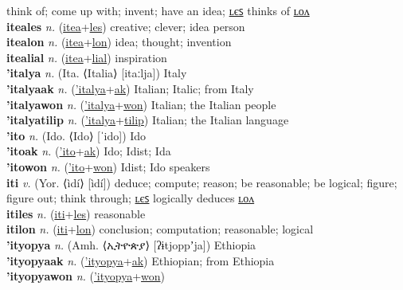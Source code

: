 think of; come up with; invent; have an idea; \hyperref[iteales]{ʟєꜱ} thinks of \hyperref[itealon]{ʟᴏᴧ} \label{itea} \\
\textbf{iteales} \textit{n.} (\hyperref[itea]{itea}+\hyperref[les]{les})
creative; clever; idea person \label{iteales} \\
\textbf{itealon} \textit{n.} (\hyperref[itea]{itea}+\hyperref[lon]{lon})
idea; thought; invention \label{itealon} \\
\textbf{itealial} \textit{n.} (\hyperref[itea]{itea}+\hyperref[lial]{lial})
inspiration \label{itealial} \\
\textbf{'italya} \textit{n.} (Ita. ⟨Italia⟩ [itaːlja])
Italy \label{'italya} \\
\textbf{'italyaak} \textit{n.} (\hyperref['italya]{'italya}+\hyperref[ak]{ak})
Italian; Italic; from Italy \label{'italyaak} \\
\textbf{'italyawon} \textit{n.} (\hyperref['italya]{'italya}+\hyperref[won]{won})
Italian; the Italian people \label{'italyawon} \\
\textbf{'italyatilip} \textit{n.} (\hyperref['italya]{'italya}+\hyperref[tilip]{tilip})
Italian; the Italian language \label{'italyatilip} \\
\textbf{'ito} \textit{n.} (Ido. ⟨Ido⟩ [ˈido])
Ido \label{'ito} \\
\textbf{'itoak} \textit{n.} (\hyperref['ito]{'ito}+\hyperref[ak]{ak})
Ido; Idist; Ida \label{'itoak} \\
\textbf{'itowon} \textit{n.} (\hyperref['ito]{'ito}+\hyperref[won]{won})
Idist; Ido speakers \label{'itowon} \\
\textbf{iti} \textit{v.} (Yor. ⟨ìdí⟩ [ìdí])
deduce; compute; reason; be reasonable; be logical; figure; figure out; think through; \hyperref[itiles]{ʟєꜱ} logically deduces \hyperref[itilon]{ʟᴏᴧ} \label{iti} \\
\textbf{itiles} \textit{n.} (\hyperref[iti]{iti}+\hyperref[les]{les})
reasonable \label{itiles} \\
\textbf{itilon} \textit{n.} (\hyperref[iti]{iti}+\hyperref[lon]{lon})
conclusion; computation; reasonable; logical \label{itilon} \\
\textbf{'ityopya} \textit{n.} (Amh. ⟨ኢትዮጵያ⟩ [ʔɨtjoppʼja])
Ethiopia \label{'ityopya} \\
\textbf{'ityopyaak} \textit{n.} (\hyperref['ityopya]{'ityopya}+\hyperref[ak]{ak})
Ethiopian; from Ethiopia \label{'ityopyaak} \\
\textbf{'ityopyawon} \textit{n.} (\hyperref['ityopya]{'ityopya}+\hyperref[won]{won})
